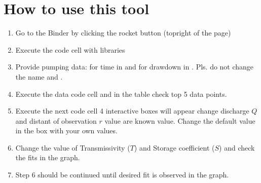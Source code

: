 \documentclass[letterpaper,10pt,english]{jupyterBook}
\begin{document}
\section{How to use this tool}
\label{\detokenize{content/tools/type_curve_fit:how-to-use-this-tool}}\begin{enumerate}
%
\item {} 
\sphinxAtStartPar
Go to the Binder by clicking the rocket button (top\sphinxhyphen{}right of the page)

\item {} 
\sphinxAtStartPar
Execute the code cell with libraries

\item {} 
\sphinxAtStartPar
Provide pumping data:  for time in  and  for drawdown in . Pls. do not change the name  and .

\item {} 
\sphinxAtStartPar
Execute the data code cell \sphinxhyphen{} and in the table check top 5 data points.

\item {} 
\sphinxAtStartPar
Execute the next code cell \sphinxhyphen{} 4 interactive boxes will appear change\sphinxhyphen{} discharge \(Q\) and distant of observation \(r\) value are known value. Change the default value in the box with your own values.

\item {} 
\sphinxAtStartPar
Change the value of Transmissivity (\(T\)) and Storage coefficient (\(S\)) and check the fits in the graph.

\item {} 
\sphinxAtStartPar
Step 6 should be continued until desired fit is observed in the graph.

\end{enumerate}
\end{document}
